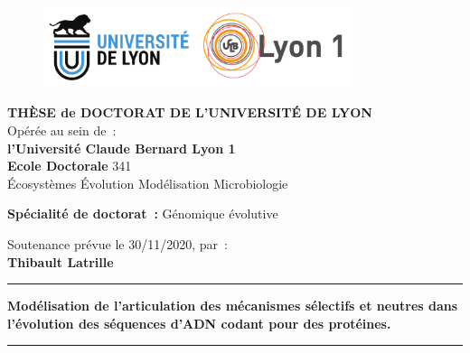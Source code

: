 \thispagestyle{empty}

\unitlength 1cm
\begin{center}

    \vspace*{-2.5cm}
    \begin{figure}[h]
        \centering
        \includegraphics[width=0.8\textwidth]{figures/logo-UdL-UCB}
    \end{figure}

    {\large \textbf{THÈSE de DOCTORAT DE L'UNIVERSITÉ DE LYON}\\}
    {Opérée au sein de~:\\}
    {\large \textbf{l'Université Claude Bernard Lyon 1}\\}
    \vspace{12pt}
    {\large \textbf{Ecole Doctorale} 341 \\
    \vspace{0.15cm}
    Écosystèmes Évolution Modélisation Microbiologie
    }
    
    \vspace{12pt}

    {\large \textbf{Spécialité de doctorat~:} Génomique évolutive
    \\}

    \vspace{0.8cm}

    {Soutenance prévue le 30/11/2020, par~:\\}
    \vspace{0.15cm}
    {\Large \textbf{Thibault Latrille}}
    \vspace{0.5cm}

    \rule{5cm}{1pt}
    \vspace{12pt}

    {\huge \textbf{Modélisation de l'articulation des mécanismes sélectifs et neutres dans l’évolution des séquences d’ADN codant pour des protéines.}\par}

    \vspace{12pt}
    \rule{5cm}{1pt}

    \vspace{0.5cm}

\end{center}

